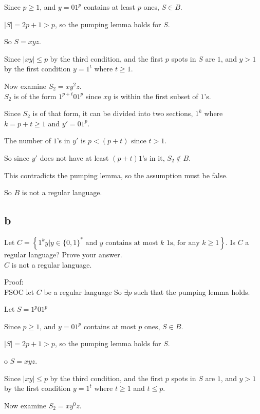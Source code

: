 \documentclass[letterpaper, 11pt]{article}
\begin{document}
Since $p \geq 1$, and $y = 01^p$ contains at least $p$ ones, $S \in B$.

$|S| = 2p + 1 > p$, so the pumping lemma holds for $S$.

So $S = xyz$.

Since $|xy| \leq p$ by the third condition, and the first $p$ spots in $S$ are $1$, and $y > 1$ by the first condition $y = 1^t$ where $t \geq 1$.

Now examine $S_2 = xy^2z$.\\

$S_2$ is of the form $1^{p+t}01^{p}$ since $xy$ is within the first subset of $1$'s.
 
Since $S_2$ is of that form, it can be divided into two sections, $1^k$ where $k = p+t \geq 1$ and $y' = 01^{p}$.

The number of $1$'s in $y'$ is $p < (p+t)$ since $t > 1$.

So since $y'$ does not have at least $(p+t) 1$'s in it, $S_2 \notin B$.

This contradicts the pumping lemma, so the assumption must be false.

So $B$ is not a regular language.

\subsection*{b}
Let $C = \left\{ 1 ^ { k } y | y \in \{ 0,1 \} ^ { * } \text { and } y \text { contains at most } k \text { 1s, for any } k \geq 1\right\}$. Is $C$ a regular language? Prove your answer.\\

$C$ is not a regular language.

Proof:\\

FSOC let $C$ be a regular language
So $\exists p$ such that the pumping lemma holds.

Let $S = 1^p01^p$

Since $p \geq 1$, and $y = 01^p$ contains at most $p$ ones, $S \in B$.

$|S| = 2p + 1 > p$, so the pumping lemma holds for $S$.

o $S = xyz$.

Since $|xy| \leq p$ by the third condition, and the first $p$ spots in $S$ are $1$, and $y > 1$ by the first condition $y = 1^t$ where $t \geq 1$  and $t \leq p$.

Now examine $S_2 = xy^0z$.\\
\end{document}
